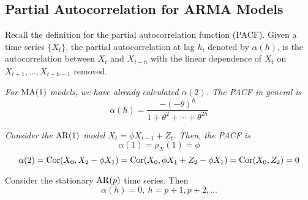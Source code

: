 \subsection{Partial Autocorrelation for ARMA Models}

Recall the definition for the partial autocorrelation function (PACF). Given a time series $\{X_t\}$, the partial autocorrelation at lag $h$, denoted by $\alpha(h)$, is the autocorrelation between $X_t$ and $X_{t+h}$ with the linear dependence of $X_t$ on $X_{t+1}, \ldots, X_{t+h-1}$ removed.


\begin{example}
    \emph{
        For $\operatorname{MA}(1)$ models, we have already calculated $\alpha(2)$. The PACF in general is 
        \[\alpha(h) = \frac{-(-\theta)^h}{1 + \theta^2 + \cdots + \theta^{2h}}\]
    }
\end{example}

\begin{example}
    \emph{
        Consider the $\operatorname{AR}(1)$ model $X_t = \phi X_{t-1} + Z_t$. Then, the PACF is
        \[\alpha(1) = \rho_X(1) = \phi\]
        \[\alpha(2) = \operatorname{Cor}(X_0, X_2 - \phi X_1) = \operatorname{Cor}(X_0, \phi X_1 + Z_2 - \phi X_1) = \operatorname{Cor}(X_0, Z_2) = 0\]
    }
\end{example}


\begin{theorem}
    Consider the stationary $\operatorname{AR}(p)$ time series. Then 
    \[\alpha(h) = 0, \ h = p+1, p + 2, \ldots\]
\end{theorem}
